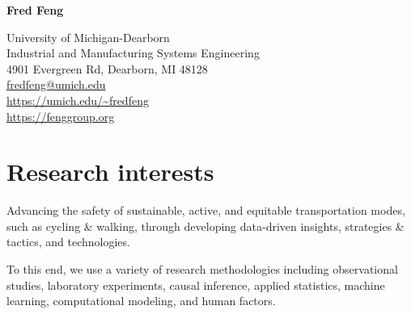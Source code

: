 \documentclass[11pt]{article}
\title{\vspace{-5em}}   %
\author{}
\date{}
\newenvironment{main}
{\begin{adjustwidth}{3em}{}}
{\end{adjustwidth}}
\begin{document}
\maketitle

\begin{multicols}{2}

{\Huge\textbf{Fred Feng}}  %


\hfill\break
\hfill\break
\hfill\break
\hfill\break

\begin{flushright}
{
University of Michigan-Dearborn\\
Industrial and Manufacturing Systems Engineering\\
4901 Evergreen Rd, Dearborn, MI 48128\\
\href{mailto:fredfeng@umich.edu}{fredfeng@umich.edu}\\
\url{https://umich.edu/~fredfeng}\\
\url{https://fenggroup.org}\\
}
\end{flushright}
\end{multicols}

\vspace{-6ex}
\noindent\makebox[\linewidth]{\rule{\textwidth}{0.8pt}}

\section*{Research interests}
\begin{main}

Advancing the safety of sustainable, active, and equitable transportation modes,
such as cycling \& walking,
through developing data-driven insights, strategies \& tactics, and technologies.

To this end, we use a variety of research methodologies including 
observational studies, 
laboratory experiments, 
causal inference,
applied statistics, 
machine learning,
computational modeling, 
and human factors.



\end{main}
\end{document}
